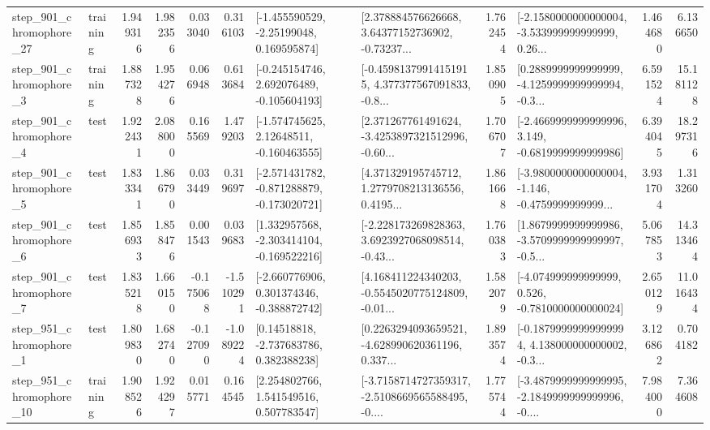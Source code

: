 \begin{tabular}{llrrrrllrlrr}
  step\_901\_chromophore\_27 &  training &      1.949316 &    1.982356 &      0.033040 &  0.316103 &    [-1.455590529, -2.25199048, 0.169595874] &  [2.378884576626668, 3.64377152736902, -0.73237... &       1.762454 &  [-2.1580000000000004, -3.533999999999999, 0.26... &            1.464680 &          6.136650 \\
   step\_901\_chromophore\_3 &  training &      1.887328 &    1.954276 &      0.066948 &  0.613684 &   [-0.245154746, 2.692076489, -0.105604193] &  [-0.45981379914151915, 4.377377567091833, -0.8... &       1.850905 &  [0.2889999999999999, -4.1259999999999994, -0.3... &            6.591524 &         15.181128 \\
   step\_901\_chromophore\_4 &      test &      1.922431 &    2.088000 &      0.165569 &  1.479203 &    [-1.574745625, 2.12648511, -0.160463555] &  [2.371267761491624, -3.4253897321512996, -0.60... &       1.706707 &  [-2.4669999999999996, 3.149, -0.6819999999999986] &            6.394045 &         18.297316 \\
   step\_901\_chromophore\_5 &      test &      1.833341 &    1.866790 &      0.033449 &  0.319697 &  [-2.571431782, -0.871288879, -0.173020721] &  [4.371329195745712, 1.2779708213136556, 0.4195... &       1.861668 &  [-3.9800000000000004, -1.146, -0.4759999999999... &            3.931704 &          1.313260 \\
   step\_901\_chromophore\_6 &      test &      1.856933 &    1.858476 &      0.001543 &  0.039683 &   [1.332957568, -2.303414104, -0.169522216] &  [-2.228173269828363, 3.6923927068098514, -0.43... &       1.760383 &  [1.8679999999999986, -3.5709999999999997, -0.5... &            5.067853 &         14.313464 \\
   step\_901\_chromophore\_7 &      test &      1.835218 &    1.660150 &     -0.175068 & -1.510291 &   [-2.660776906, 0.301374346, -0.388872742] &  [4.168411224340203, -0.5545020775124809, -0.01... &       1.582079 &   [-4.074999999999999, 0.526, -0.7810000000000024] &            2.650129 &         11.016434 \\
   step\_951\_chromophore\_1 &      test &      1.809830 &    1.682740 &     -0.127090 & -1.089224 &     [0.14518818, -2.737683786, 0.382388238] &  [0.2263294093659521, -4.628990620361196, 0.337... &       1.893574 &  [-0.18799999999999994, 4.138000000000002, -0.3... &            3.126862 &          0.704182 \\
  step\_951\_chromophore\_10 &  training &      1.908526 &    1.924297 &      0.015771 &  0.164545 &     [2.254802766, 1.541549516, 0.507783547] &  [-3.7158714727359317, -2.5108669565588495, -0.... &       1.775744 &  [-3.4879999999999995, -2.1849999999999996, -0.... &            7.984000 &          7.364608 \\

\end{tabular}
